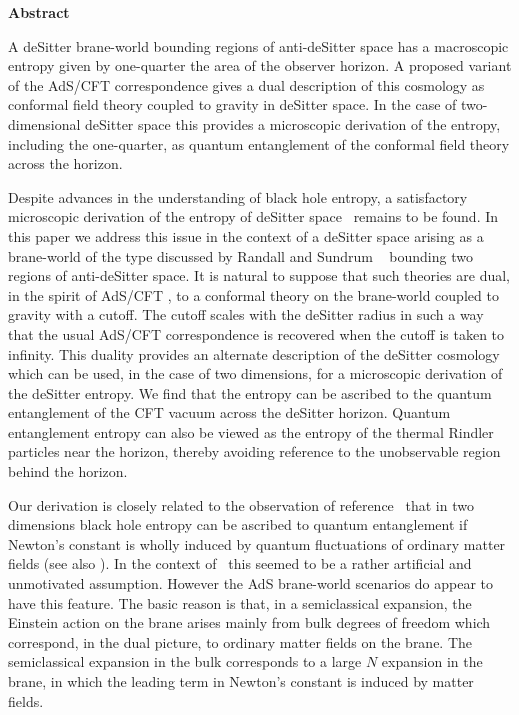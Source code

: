 %
%
\centerline{\bf Abstract}
{A deSitter brane-world bounding regions of anti-deSitter space
has a macroscopic entropy given by one-quarter the area of the
observer horizon.  A proposed variant of the AdS/CFT correspondence
gives a dual description of this cosmology as conformal field theory
coupled to gravity in deSitter space. In the case of two-dimensional
deSitter space  
this provides a microscopic
derivation of the entropy, including the one-quarter, as
quantum entanglement of the conformal field theory across the horizon.}


\smallskip
\noindent
\Date{}
\listtoc
\writetoc



Despite advances in the understanding of black hole entropy,
a satisfactory microscopic derivation of the entropy of deSitter space \gh\
remains to be found. In this paper we address this issue in the context
of a deSitter space arising as a brane-world of the 
type discussed by  Randall and Sundrum \rs\  
bounding two regions of
anti-deSitter space.
It is natural to suppose that such
theories are dual, in the spirit of AdS/CFT \jm , to a conformal
theory on the brane-world coupled to gravity with
a cutoff. The cutoff scales with the deSitter radius in such a way that the
usual AdS/CFT correspondence is recovered when the cutoff is taken to
infinity.  This duality provides an alternate description of the
deSitter cosmology which can be used, in the case of two 
dimensions, for a microscopic derivation of the
deSitter entropy. We find that the entropy can be ascribed to the quantum
entanglement of the CFT vacuum across the deSitter horizon. Quantum 
entanglement entropy can also be viewed as the entropy of the thermal
Rindler particles near the horizon, thereby avoiding reference to 
the unobservable region behind the horizon. 

Our derivation is closely related to the observation of reference 
\fpst\ that in two
dimensions black hole
entropy can be ascribed to quantum entanglement if
Newton's constant is wholly induced by quantum fluctuations of ordinary matter
fields (see also \refs{\tj, \su, \ffz, \ff}). 
In the context of  \fpst\ this seemed to be a
rather artificial and unmotivated assumption. However
the AdS brane-world scenarios do appear to have this feature.
The basic reason is that, in a semiclassical expansion, 
 the Einstein action on the brane
arises mainly from bulk degrees of
freedom
which correspond, in the dual picture, to ordinary matter fields on the
brane.
The semiclassical expansion in the bulk corresponds to a large $N$ 
expansion in the brane, in which the leading term in 
Newton's constant is induced by matter fields. 

